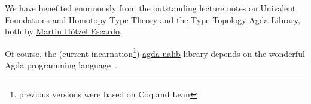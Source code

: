 \documentclass[sigplan,screen]{acmart}
\newcommand{\agdaualib}{\href{https://ualib.org}{agda-ualib}\xspace}
\newcommand{\agdaualib}{\href{anonymizedLink/agda-ualib.html}{agda-ualib}\xspace}
\begin{document}
We have benefited enormously from the outstanding lecture notes on \href{https://www.cs.bham.ac.uk/~mhe/HoTT-UF-in-Agda-Lecture-Notes}{Univalent Foundations and Homotopy Type Theory} and the \href{https://github.com/martinescardo/TypeTopology}{Type Topology} Agda Library, both by \href{https://www.cs.bham.ac.uk/~mhe}{Martin Hötzel Escardo}.

Of course, the (current incarnation\footnote{previous versions were based on Coq and Lean}) \agdaualib library depends on the wonderful Agda programming language~\cite{Norell:2009}.








\end{document}
